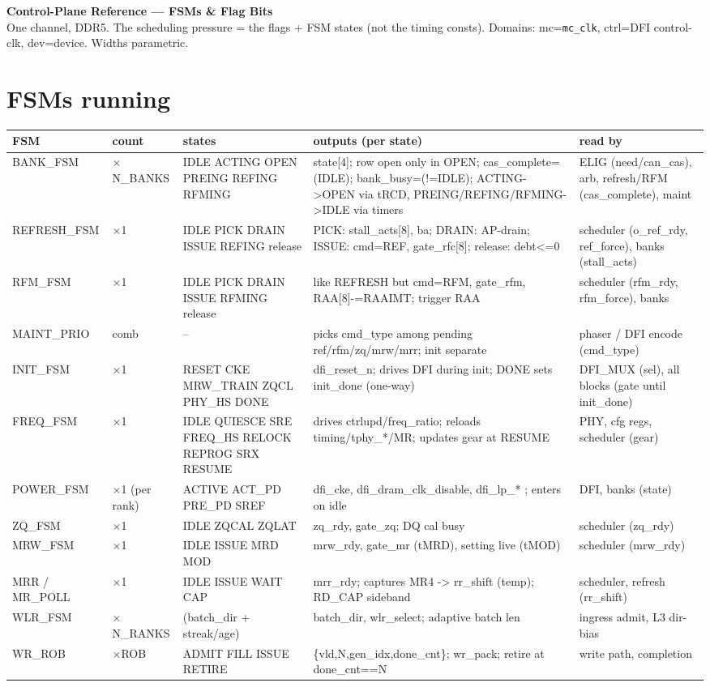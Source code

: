 \documentclass[9pt]{extarticle}
\newenvironment{fsm}{%
  \footnotesize\begin{longtable}{KQVZA}
  \rowcolor{hb}\textbf{FSM} & \textbf{count} & \textbf{states} & \textbf{outputs (per state)} & \textbf{read by}\\ \midrule\endhead}
  {\bottomrule\end{longtable}}
\begin{document}
\begin{center}
{\LARGE\textbf{Control-Plane Reference --- FSMs \& Flag Bits}}\\[2pt]
{\small One channel, DDR5. The scheduling pressure = the flags + FSM states (not the timing consts).
Domains: mc=\texttt{mc\_clk}, ctrl=DFI control-clk, dev=device. Widths parametric.}
\end{center}

\section{FSMs running}
\begin{fsm}
BANK\_FSM & $\times$N\_BANKS & IDLE ACTING OPEN PREING REFING RFMING & state[4]; row open only in OPEN; cas\_complete=(IDLE); bank\_busy=(!=IDLE); ACTING->OPEN via tRCD, PREING/REFING/RFMING->IDLE via timers & ELIG (need/can\_cas), arb, refresh/RFM (cas\_complete), maint\\
REFRESH\_FSM & $\times$1 & IDLE PICK DRAIN ISSUE REFING release & PICK: stall\_acts[8], ba; DRAIN: AP-drain; ISSUE: cmd=REF, gate\_rfc[8]; release: debt<=0 & scheduler (o\_ref\_rdy, ref\_force), banks (stall\_acts)\\
RFM\_FSM & $\times$1 & IDLE PICK DRAIN ISSUE RFMING release & like REFRESH but cmd=RFM, gate\_rfm, RAA[8]-=RAAIMT; trigger RAA & scheduler (rfm\_rdy, rfm\_force), banks\\
MAINT\_PRIO & comb & -- & picks cmd\_type among pending {ref/rfm/zq/mrw/mrr}; init separate & phaser / DFI encode (cmd\_type)\\
INIT\_FSM & $\times$1 & RESET CKE MRW\_TRAIN ZQCL PHY\_HS DONE & dfi\_reset\_n; drives DFI during init; DONE sets init\_done (one-way) & DFI\_MUX (sel), all blocks (gate until init\_done)\\
FREQ\_FSM & $\times$1 & IDLE QUIESCE SRE FREQ\_HS RELOCK REPROG SRX RESUME & drives ctrlupd/freq\_ratio; reloads timing/tphy\_*/MR; updates gear at RESUME & PHY, cfg regs, scheduler (gear)\\
POWER\_FSM & $\times$1 (per rank) & ACTIVE ACT\_PD PRE\_PD SREF & dfi\_cke, dfi\_dram\_clk\_disable, dfi\_lp\_* ; enters on idle & DFI, banks (state)\\
ZQ\_FSM & $\times$1 & IDLE ZQCAL ZQLAT & zq\_rdy, gate\_zq; DQ cal busy & scheduler (zq\_rdy)\\
MRW\_FSM & $\times$1 & IDLE ISSUE MRD MOD & mrw\_rdy, gate\_mr (tMRD), setting live (tMOD) & scheduler (mrw\_rdy)\\
MRR / MR\_POLL & $\times$1 & IDLE ISSUE WAIT CAP & mrr\_rdy; captures MR4 -> rr\_shift (temp); RD\_CAP sideband & scheduler, refresh (rr\_shift)\\
WLR\_FSM & $\times$N\_RANKS & (batch\_dir + streak/age) & batch\_dir, wlr\_select; adaptive batch len & ingress admit, L3 dir-bias\\
WR\_ROB & $\times$ROB & ADMIT FILL ISSUE RETIRE & \{vld,N,gen\_idx,done\_cnt\}; wr\_pack; retire at done\_cnt==N & write path, completion\\
\end{fsm}
\end{document}
